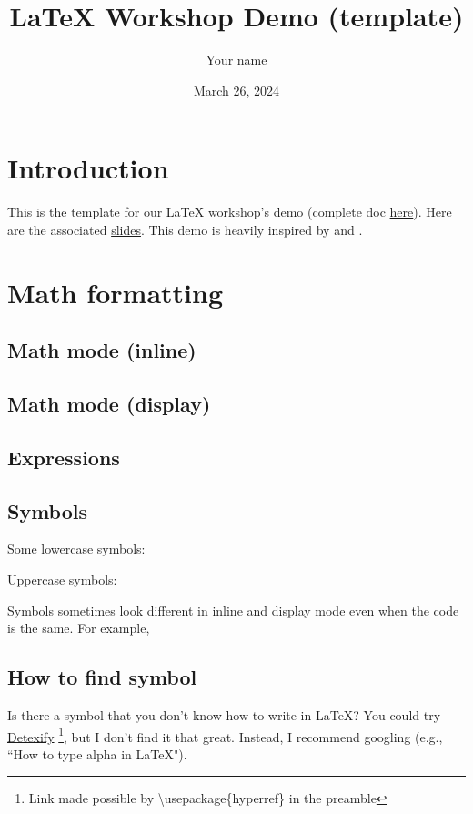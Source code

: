 \documentclass{article}
\title{\LaTeX{} Workshop Demo (template)}
\author{Your name}
\date{March 26, 2024}
\begin{document}
\maketitle

\tableofcontents
\newpage

\section{Introduction}

This is the template for our \LaTeX{} workshop's demo (complete doc \href{https://www.overleaf.com/read/qfywdwxzzyhp#607b52}{here}). Here are the associated \href{https://docs.google.com/presentation/d/1zO6tLPnshC0WfSBvqL2mZKDLLprnuQr2t1IMmsjBdlM/edit?usp=sharing}{slides}. This demo is heavily inspired by \cite{latex_vid_1} and \cite{latex_vid_2}.

\section{Math formatting}

\subsection{Math mode (inline)}

\subsection{Math mode (display)}

\subsection{Expressions}

\subsection{Symbols}

Some lowercase symbols: 

Uppercase symbols: 

Symbols sometimes look different in inline and display mode even when the code is the same. For example,

\subsection{How to find symbol}

Is there a symbol that you don't know how to write in \LaTeX? You could try \href{https://detexify.kirelabs.org/classify.html}{Detexify} \footnote{Link made possible by \textbackslash usepackage\{hyperref\} in the preamble}, but I don't find it that great. Instead, I recommend googling (e.g., ``How to type alpha in LaTeX").
\end{document}

